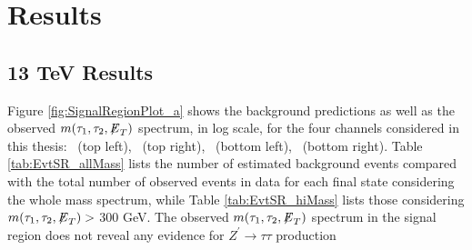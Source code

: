 \section{Results}\label{sec:results}

\subsection{13 TeV Results}

Figure \ref{fig:SignalRegionPlot_a} shows the background predictions as well as the observed $m(\tau_{1},\tau_{2},{\not\mathrel{E}}_T)$ spectrum, in log scale, for the four 
channels considered in this thesis: \mutau ~(top left), \ditauhad ~(top right), \etau ~(bottom left), \emu ~(bottom right). 
Table \ref{tab:EvtSR_allMass} lists the number of estimated background events compared with the total number of observed events in data for each final state
considering the whole mass spectrum, while Table \ref{tab:EvtSR_hiMass} lists those considering $m(\tau_1,\tau_2,{\not\mathrel{E}}_T) >$ 300 GeV.
The observed $m(\tau_{1},\tau_{2},{\not\mathrel{E}}_T)$ spectrum in the signal region does not reveal any evidence for $Z^{\prime}\to\tau\tau$ production 
